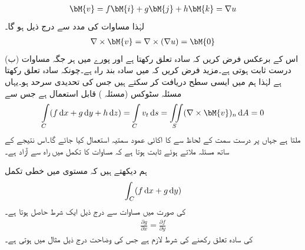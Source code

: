 \begin{align*}
\bM{v}=f\bM{i}+g\bM{j}+h\bM{k}=\nabla  u
\end{align*}
لہٰذا  مساوات  کی مدد سے درج ذیل ہو گا۔
\begin{align*}
\nabla \times \bM{v}=\nabla \times (\nabla u)=\bM{0}
\end{align*}
(ب) اس کے برعکس فرض کریں کہ  سادہ تعلق رکھتا ہے اور  پورے  میں ہر جگہ مساوات  درست ثابت ہوتی ہے۔مزید فرض کریں کہ  میں  سادہ بند راہ ہے۔چونکہ  سادہ تعلق رکھتا ہے لہٰذا ہم  میں ایسی سطح  دریافت کر سکتے ہیں جس کی تحدیدی سرحد  ہو۔یہاں مسئلہ سٹوکس (مسئلہ ) قابل استعمال  ہے جس سے
\begin{align*}
\int\limits_C(f\dif x+g\dif y+h\dif z)=\int\limits_C v_t \dif s=\iint\limits_S (\nabla \times \bM{v})_n \dif A=0
\end{align*}
ملتا ہے جہاں  پر درست سمت کے لحاظ سے  کا اکائی عمود سمتیہ  استعمال کیا جائے گا۔اس نتیجے کے ساتھ مسئلہ  ملاتے ہوئے ثابت ہوتا ہے کہ  مساوات  کا تکمل  میں راہ سے آزاد ہے۔

ہم دیکھتے ہیں کہ  مستوی میں خطی تکمل
\begin{align*}
\int_C (f\dif x+g\dif y)
\end{align*}
کی صورت میں مساوات  سے درج ذیل ایک شرط حاصل ہوتا ہے۔
\begin{align}\label{مساوات_خطی_تکمل_دو_متغیرات_شرط}
\frac{\partial g}{\partial x}=\frac{\partial f}{\partial y}
\end{align}
 کی سادہ تعلق رکھنے کی شرط  لازم ہے جس کی وضاحت درج ذیل مثال میں ہوتی ہے۔

